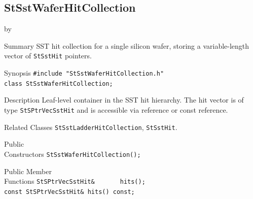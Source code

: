 \documentclass[twoside]{article}
\newcommand{\entrylabel}[1]{\mbox{\textbf{{#1}}}\hfil}%
\newenvironment{entry}
{\begin{list}{}%
    {\renewcommand{\makelabel}{\entrylabel}%
     \setlength{\labelwidth}{90pt}%
     \setlength{\leftmargin}{\labelwidth}
     \advance\leftmargin by \labelsep%
      }%
    }%
  {\end{list}}
\newcommand{\Entrylabel}[1]%
{\raisebox{0pt}[1ex][0pt]{\makebox[\labelwidth][l]%
    {\parbox[t]{\labelwidth}{\hspace{0pt}\textbf{{#1}}}}}}
\newenvironment{Entry}%
{\renewcommand{\entrylabel}{\Entrylabel}\begin{entry}}%
  {\end{entry}}
\begin{document}
\subsection{StSstWaferHitCollection}
\label{sec:StSstWaferHitCollection}
\begin{Entry}
\item[Summary] SST hit collection for a single silicon wafer, storing a
    variable-length vector of \texttt{StSstHit} pointers.
\item[Synopsis]
    \verb+#include "StSstWaferHitCollection.h"+\\
    \verb+class StSstWaferHitCollection;+\\
\item[Description]
    Leaf-level container in the SST hit hierarchy.  The hit vector is of type
    \texttt{StSPtrVecSstHit} and is accessible via reference or const reference.
\item[Related Classes]
    \texttt{StSstLadderHitCollection}, \texttt{StSstHit}.
\item[Public\\ Constructors]
    \verb+StSstWaferHitCollection();+\\
\item[Public Member\\ Functions]
    \verb+StSPtrVecSstHit&       hits();+\\
    \verb+const StSPtrVecSstHit& hits() const;+\\
\end{Entry}
\clearpage
\end{document}
